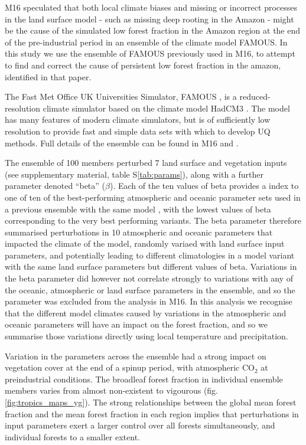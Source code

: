 \documentclass[gmd, manuscript]{copernicus}
\begin{document}
M16 speculated that both local climate biases and missing or incorrect processes in the land surface model - such as missing deep rooting in the Amazon - might be the cause of the simulated low forest fraction in the Amazon region at the end of the pre-industrial period in an ensemble of the climate model FAMOUS. In this study we use the ensemble of FAMOUS previously used in M16, to attempt to find and correct the cause of persistent low forest fraction in the amazon, identified in that paper. 

The Fast Met Office UK Universities Simulator, FAMOUS \citep{jones2005systematic, smith2008famous}, is a reduced-resolution climate simulator based on the climate model HadCM3 \citep{gordon2000simulation, pope2000impact}. The model has many features of modern climate simulators, but is of sufficiently low resolution to provide fast and simple data sets with which to develop UQ methods. Full details of the ensemble can be found in M16 and \cite{williams2013optimising}.

The ensemble of 100 members perturbed 7 land surface and vegetation inputs (see supplementary material, table S\ref{tab:params}), along with a further parameter denoted ``beta'' ($\beta$). Each of the ten values of beta provides a index to one of ten of the best-performing atmospheric and oceanic parameter sets used in a previous ensemble with the same model \cite{gregoire2010optimal}, with the lowest values of beta corresponding to the very best performing variants. The beta parameter therefore summarised perturbations in 10 atmospheric and oceanic parameters that impacted the climate of the model, randomly variaed with land surface input parameters, and potentially leading to different climatologies in a model variant with the same land surface parameters but different values of beta. Variations in the beta parameter did however not correlate strongly to variations with any of the oceanic, atmospheric or land surface parameters in the ensemble, and so the parameter was excluded from the analysis in M16. In this analysis we recognise that the different model climates caused by variations in the atmospheric and oceanic parameters will have an impact on the forest fraction, and so we summarise those variations directly using local temperature and precipitation.

Variation in the parameters across the ensemble had a strong impact on vegetation cover at the end of a spinup period, with atmospheric CO$_2$ at preindustrial conditions. The broadleaf forest fraction in individual ensemble members varies from almost non-existent to vigourous (fig. \ref{fig:tropics_maps_yg}). The strong relationships between the global mean forest fraction and the mean forest fraction in each region implies that perturbations in input parameters exert a larger control over all forests simultaneously, and individual forests to a smaller extent.
\end{document}
